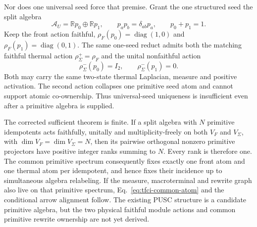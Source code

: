 \documentclass[11pt]{article}
\begin{document}
Nor does one universal seed force that premise.  Grant the one structured
seed the split algebra
\begin{equation}
 \mathcal A_U=\mathbb Rp_0\oplus\mathbb Rp_1,
 \qquad p_ap_b=\delta_{ab}p_a,
 \qquad p_0+p_1=1.
 \label{eq:universal-seed-split-algebra}
\end{equation}
Keep the front action faithful,
$\rho_F(p_0)=\operatorname{diag}(1,0)$ and
$\rho_F(p_1)=\operatorname{diag}(0,1)$.  The same one-seed reduct admits both
the matching faithful thermal action $\rho_\Sigma^+=\rho_F$ and the unital
nonfaithful action
\begin{equation}
 \rho_\Sigma^-(p_0)=I_2,
 \qquad \rho_\Sigma^-(p_1)=0.
 \label{eq:universal-seed-nonfaithful-control}
\end{equation}
Both may carry the same two-state thermal Laplacian, measure and positive
activation.  The second action collapses one primitive seed atom and cannot
support atomic co-ownership.  Thus universal-seed uniqueness is insufficient
even after a primitive algebra is supplied.

The corrected sufficient theorem is finite.  If a split algebra with $N$
primitive idempotents acts faithfully, unitally and multiplicity-freely on
both $V_F$ and $V_\Sigma$, with
$\dim V_F=\dim V_\Sigma=N$, then its pairwise orthogonal nonzero primitive
projectors have positive integer ranks summing to $N$.  Every rank is
therefore one.  The common primitive spectrum consequently fixes exactly one
front atom and one thermal atom per idempotent, and hence fixes their
incidence up to simultaneous algebra relabeling.  If the measure,
macroterminal and rewrite graph also live on that primitive spectrum,
Eq.~\eqref{eq:tfci-common-atom} and the conditional arrow alignment follow.
The existing PUSC structure is a candidate primitive algebra, but the two
physical faithful module actions and common primitive rewrite ownership are
not yet derived.
\end{document}
